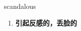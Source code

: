 
\begin{frame}
{\huge scandalous}
\begin{center}
\begin{enumerate}\Large
  \item \textbf{引起反感的，丢脸的}
\end{enumerate}
\end{center}
\end{frame}
